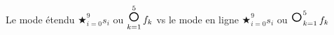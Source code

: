 \documentclass[border=3pt]{standalone}
\begin{document}
Le mode étendu
$\displaystyle \bigstar_{i = 0}^{9} s_i$
ou
$\displaystyle \bigcompo_{k = 1}^{5} f_k$
vs le mode en ligne
$\bigstar_{i = 0}^{9} s_i$ ou $\bigcompo_{k = 1}^{5} f_k$
\end{document}
